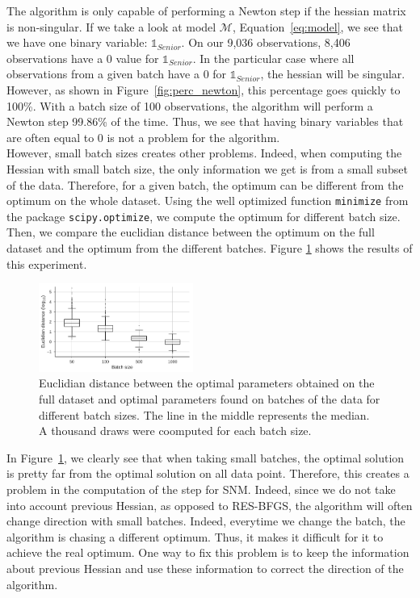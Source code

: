 \documentclass[conference]{IEEEtran}
\begin{document}
The algorithm is only capable of performing a Newton step if the hessian matrix is non-singular. If we take a look at model $\mathcal{M}$, Equation~\ref{eq:model}, we see that we have one binary variable: $\mathbb{1}_{Senior}$. On our 9,036 observations, 8,406 observations have a 0 value for $\mathbb{1}_{Senior}$. In the particular case where all observations from a given batch have a 0 for $\mathbb{1}_{Senior}$, the hessian will be singular. However, as shown in Figure~\ref{fig:perc_newton}, this percentage goes quickly to 100\%. With a batch size of 100 observations, the algorithm will perform a Newton step 99.86\% of the time. Thus, we see that having binary variables that are often equal to 0 is not a problem for the algorithm. \\

However, small batch sizes creates other problems. Indeed, when computing the Hessian with small batch size, the only information we get is from a small subset of the data. Therefore, for a given batch, the optimum can be different from the optimum on the whole dataset. Using the well optimized function \texttt{minimize} from the package \texttt{scipy.optimize}, we compute the optimum for different batch size. Then, we compare the euclidian distance between the optimum on the full dataset and the optimum from the different batches. Figure \ref{fig:batch_dist} shows the results of this experiment.

\begin{figure}[t]
\centering
\includegraphics[width=0.45\textwidth]{../figures/dist.pdf}
\vspace{-0.3cm}
\caption{Euclidian distance between the optimal parameters obtained on the full dataset and optimal parameters found on batches of the data for different batch sizes. The line in the middle represents the median. A thousand draws were coomputed for each batch size.}
\label{fig:batch_dist}
\vspace{-0.3cm}
\end{figure}

In Figure~\ref{fig:batch_dist}, we clearly see that when taking small batches, the optimal solution is pretty far from the optimal solution on all data point. Therefore, this creates a problem in the computation of the step for SNM. Indeed, since we do not take into account previous Hessian, as opposed to RES-BFGS, the algorithm will often change direction with small batches. Indeed, everytime we change the batch, the algorithm is chasing a different optimum. Thus, it makes it difficult for it to achieve the real optimum. One way to fix this problem is to keep the information about previous Hessian and use these information to correct the direction of the algorithm.
\end{document}
